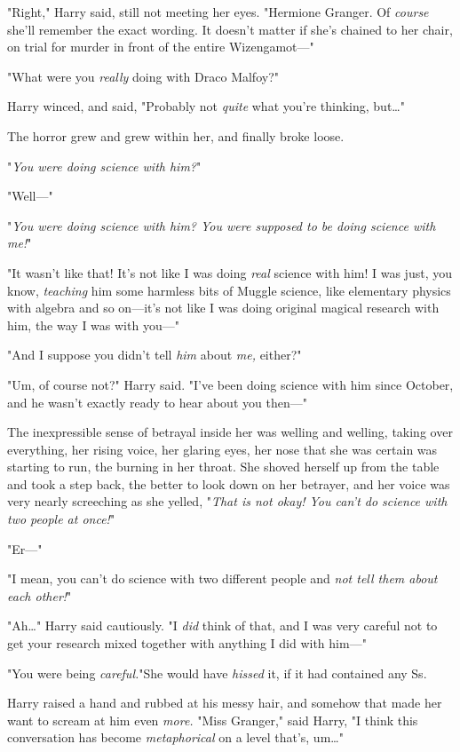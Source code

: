 "Right," Harry said, still not meeting her eyes. "Hermione Granger. Of
\emph{course} she'll remember the exact wording. It doesn't matter if she's
chained to her chair, on trial for murder in front of the entire Wizengamot---"

"What were you \emph{really} doing with Draco Malfoy?"

Harry winced, and said, "Probably not \emph{quite} what you're thinking,
but{\ldots}"

The horror grew and grew within her, and finally broke loose.

"\emph{You were doing \emph{science} with him?}"

"Well---"

"\emph{You were doing \emph{science} with him? You were supposed to be doing science
with \emph{me}!}"

"It wasn't like that! It's not like I was doing \emph{real} science with him! I
was just, you know, \emph{teaching} him some harmless bits of Muggle science,
like elementary physics with algebra and so on---it's not like I was doing
original magical research with him, the way I was with you---"

"And I suppose you didn't tell \emph{him} about \emph{me,} either?"

"Um, of course not?" Harry said. "I've been doing science with him since
October, and he wasn't exactly ready to hear about you then---"

The inexpressible sense of betrayal inside her was welling and welling, taking
over everything, her rising voice, her glaring eyes, her nose that she was
certain was starting to run, the burning in her throat. She shoved herself up
from the table and took a step back, the better to look down on her betrayer,
and her voice was very nearly screeching as she yelled, "\emph{That is not
okay! You can't do science with two people at once!}"

"Er---"

"I mean, you can't do science with two different people and \emph{not tell them
about each other!}"

"Ah{\ldots}" Harry said cautiously. "I \emph{did} think of that, and I was very
careful not to get your research mixed together with anything I did with him---"

"You were being \emph{careful.}"She would have \emph{hissed} it, if it had
contained any Ss.

Harry raised a hand and rubbed at his messy hair, and somehow that made her
want to scream at him even \emph{more.} "Miss Granger," said Harry, "I think
this conversation has become \emph{metaphorical} on a level that's, um{\ldots}"

